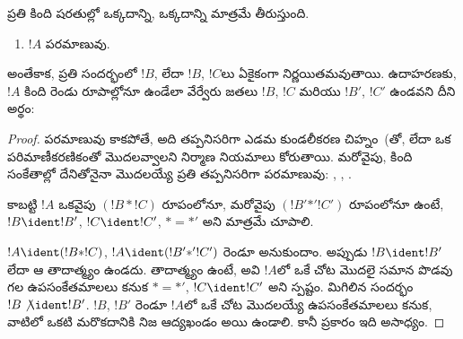 \documentclass[../../../include/open-logic-section]{subfiles}
\begin{document}
\begin{prop}[ఏకార్థ పఠనీయత]
ప్రతి  కింది షరతుల్లో ఒక్కదాన్ని, ఒక్కదాన్ని మాత్రమే తీరుస్తుంది.
\begin{enumerate}
\item $!A$ పరమాణువు.







\end{enumerate}
అంతేకాక, ప్రతి సందర్భంలో $!B$, లేదా $!B$, $!C$లు ఏకైకంగా
నిర్ణయితమవుతాయి. ఉదాహరణకు, $!A$ కింది రెండు రూపాల్లోనూ ఉండేలా
వేర్వేరు జతలు $!B$, $!C$ మరియు $!B'$, $!C'$ ఉండవని దీని అర్థం:
\end{prop}

\begin{proof}
 పరమాణువు కాకపోతే, అది తప్పనిసరిగా ఎడమ కుండలీకరణ
చిహ్నం~(తో,  లేదా ఒక పరిమాణీకరణికంతో
మొదలవ్వాలని నిర్మాణ నియమాలు కోరుతాయి. మరోవైపు, కింది సంకేతాల్లో
దేనితోనైనా మొదలయ్యే ప్రతి  తప్పనిసరిగా పరమాణువు:
, , .

కాబట్టి $!A$ ఒకవైపు $(!B \ast !C)$ రూపంలోనూ, మరోవైపు
$(!B' \mathbin{\ast'} !C')$ రూపంలోనూ ఉంటే, $!B \ident !B'$,
$!C \ident !C'$, $\ast = {\ast'}$ అని మాత్రమే చూపాలి.

$!A \ident (!B \ast !C)$, $!A \ident (!B'
\mathbin{\ast'} !C')$ రెండూ అనుకుందాం. అప్పుడు $!B \ident !B'$
లేదా ఆ తాదాత్మ్యం ఉండదు. తాదాత్మ్యం ఉంటే, అవి $!A$లో ఒకే చోట మొదలై సమాన పొడవు గల
ఉపసంకేతమాలలు కనుక $\ast = {\ast'}$, $!C \ident !C'$ అని స్పష్టం.
మిగిలిన సందర్భం $!B \not\ident !B'$. $!B$, $!B'$ రెండూ $!A$లో
ఒకే చోట మొదలయ్యే ఉపసంకేతమాలలు కనుక, వాటిలో ఒకటి మరొకదానికి నిజ
ఆద్యఖండం అయి ఉండాలి. కానీ  ప్రకారం ఇది అసాధ్యం.
\end{proof}
\end{document}
